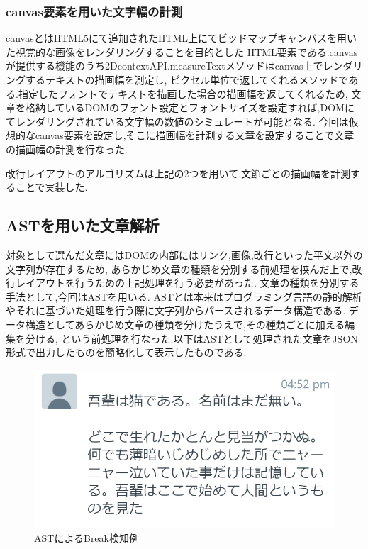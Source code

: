 
\subsubsection{canvas要素を用いた文字幅の計測}
canvasとはHTML5にて追加されたHTML上にてビッドマップキャンバスを用いた視覚的な画像をレンダリングすることを目的とした
HTML要素である.canvasが提供する機能のうち2DcontextAPI.measureTextメソッドはcanvas上でレンダリングするテキストの描画幅を測定し,
ピクセル単位で返してくれるメソッドである.指定したフォントでテキストを描画した場合の描画幅を返してくれるため,
文章を格納しているDOMのフォント設定とフォントサイズを設定すれば,DOMにてレンダリングされている文字幅の数値のシミュレートが可能となる.
今回は仮想的なcanvas要素を設定し,そこに描画幅を計測する文章を設定することで文章の描画幅の計測を行なった.

改行レイアウトのアルゴリズムは上記の2つを用いて,文節ごとの描画幅を計測することで実装した.

\subsection{ASTを用いた文章解析}
対象として選んだ文章にはDOMの内部にはリンク,画像,改行といった平文以外の文字列が存在するため,
あらかじめ文章の種類を分別する前処理を挟んだ上で,改行レイアウトを行うための上記処理を行う必要があった.
文章の種類を分別する手法として,今回はAST\footnotemark[4]を用いる.
ASTとは本来はプログラミング言語の静的解析やそれに基づいた処理を行う際に文字列からパースされるデータ構造である.
データ構造としてあらかじめ文章の種類を分けたうえで,その種類ごとに加える編集を分ける,
という前処理を行なった.以下はASTとして処理された文章をJSON形式で出力したものを簡略化して表示したものである.


\newpage
\begin{figure}[H]
    \centering
    \label{fig:ASTofBreak}
    \includegraphics[width=0.6\columnwidth]{image/03/breakAST.png}
	\caption[ASTによるBreak検知例]{ASTによるBreak検知例}
\end{figure}

